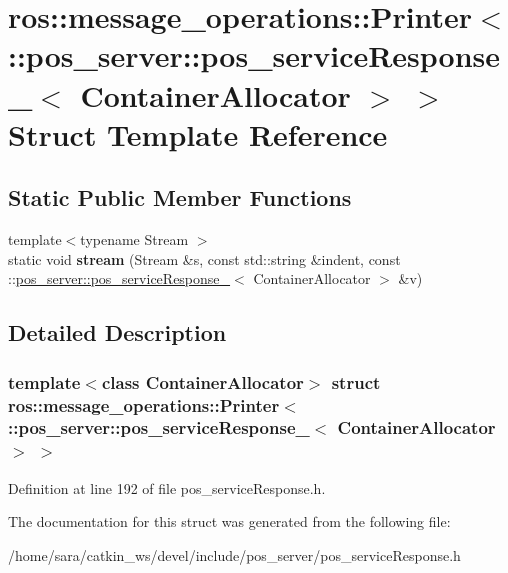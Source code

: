 \hypertarget{structros_1_1message__operations_1_1Printer_3_01_1_1pos__server_1_1pos__serviceResponse___3_01ContainerAllocator_01_4_01_4}{}\section{ros\+:\+:message\+\_\+operations\+:\+:Printer$<$ \+:\+:pos\+\_\+server\+:\+:pos\+\_\+service\+Response\+\_\+$<$ Container\+Allocator $>$ $>$ Struct Template Reference}
\label{structros_1_1message__operations_1_1Printer_3_01_1_1pos__server_1_1pos__serviceResponse___3_01ContainerAllocator_01_4_01_4}
\subsection*{Static Public Member Functions}
\begin{DoxyCompactItemize}
\item 
\mbox{\label{structros_1_1message__operations_1_1Printer_3_01_1_1pos__server_1_1pos__serviceResponse___3_01ContainerAllocator_01_4_01_4_a0105e374da18c28c8e3da50938811d4f}} 
{\footnotesize template$<$typename Stream $>$ }\\static void {\bfseries stream} (Stream \&s, const std\+::string \&indent, const \+::\hyperlink{structpos__server_1_1pos__serviceResponse__}{pos\+\_\+server\+::pos\+\_\+service\+Response\+\_\+}$<$ Container\+Allocator $>$ \&v)
\end{DoxyCompactItemize}


\subsection{Detailed Description}
\subsubsection*{template$<$class Container\+Allocator$>$\newline
struct ros\+::message\+\_\+operations\+::\+Printer$<$ \+::pos\+\_\+server\+::pos\+\_\+service\+Response\+\_\+$<$ Container\+Allocator $>$ $>$}



Definition at line 192 of file pos\+\_\+service\+Response.\+h.



The documentation for this struct was generated from the following file\+:\begin{DoxyCompactItemize}
\item 
/home/sara/catkin\+\_\+ws/devel/include/pos\+\_\+server/pos\+\_\+service\+Response.\+h\end{DoxyCompactItemize}
